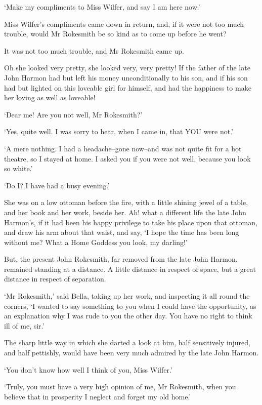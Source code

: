 ‘Make my compliments to Miss Wilfer, and say I am here now.’

Miss Wilfer’s compliments came down in return, and, if it were not too
much trouble, would Mr Rokesmith be so kind as to come up before he
went?

It was not too much trouble, and Mr Rokesmith came up.

Oh she looked very pretty, she looked very, very pretty! If the father
of the late John Harmon had but left his money unconditionally to his
son, and if his son had but lighted on this loveable girl for himself,
and had the happiness to make her loving as well as loveable!

‘Dear me! Are you not well, Mr Rokesmith?’

‘Yes, quite well. I was sorry to hear, when I came in, that YOU were
not.’

‘A mere nothing. I had a headache--gone now--and was not quite fit for
a hot theatre, so I stayed at home. I asked you if you were not well,
because you look so white.’

‘Do I? I have had a busy evening.’

She was on a low ottoman before the fire, with a little shining jewel
of a table, and her book and her work, beside her. Ah! what a different
life the late John Harmon’s, if it had been his happy privilege to take
his place upon that ottoman, and draw his arm about that waist, and say,
‘I hope the time has been long without me? What a Home Goddess you look,
my darling!’

But, the present John Rokesmith, far removed from the late John Harmon,
remained standing at a distance. A little distance in respect of space,
but a great distance in respect of separation.

‘Mr Rokesmith,’ said Bella, taking up her work, and inspecting it all
round the corners, ‘I wanted to say something to you when I could have
the opportunity, as an explanation why I was rude to you the other day.
You have no right to think ill of me, sir.’

The sharp little way in which she darted a look at him, half sensitively
injured, and half pettishly, would have been very much admired by the
late John Harmon.

‘You don’t know how well I think of you, Miss Wilfer.’

‘Truly, you must have a very high opinion of me, Mr Rokesmith, when you
believe that in prosperity I neglect and forget my old home.’

